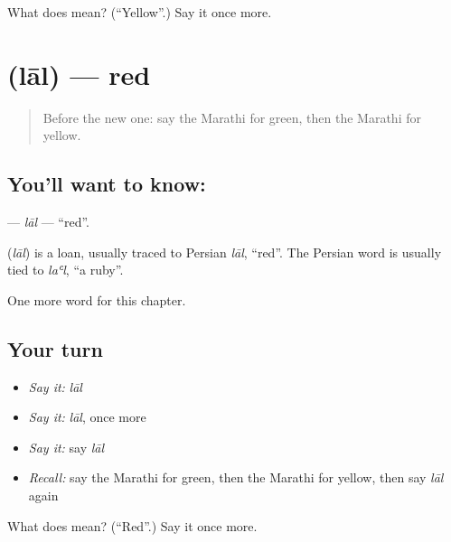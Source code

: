 \begin{tcolorbox}[breakable,colback=teal!4,colframe=teal!35!black,title={Before you move on}]
What does  mean? (\textquotedblleft{}Yellow\textquotedblright{}.) Say it once more.
\end{tcolorbox}
\section[\texorpdfstring{\mr{लाल} (lāl)}{लाल (lāl)}]{ (lāl) — red}

\label{lesson:MR-C107-lal}



\begin{quote}
Before the new one: say the Marathi for green, then the Marathi for yellow.
\end{quote}

\subsection*{You'll want to know: }
\textbf{} — \emph{lāl} — \textquotedblleft{}red\textquotedblright{}.

\begin{cousinweb}
\textbf{} (\emph{lāl}) is a loan, usually traced to Persian \emph{lāl}, \textquotedblleft{}red\textquotedblright{}. The Persian word is usually tied to \emph{laʿl}, \textquotedblleft{}a ruby\textquotedblright{}.
\end{cousinweb}

\begin{grammarlens}[title={What you've built}]
One more word for this chapter.
\end{grammarlens}

\subsection*{Your turn}
\begin{itemize}
\raggedright
  \item \emph{Say it:} \emph{lāl}
  \item \emph{Say it:} \emph{lāl}, once more
  \item \emph{Say it:} say \emph{lāl}
  \item \emph{Recall:} say the Marathi for green, then the Marathi for yellow, then say \emph{lāl} again
\end{itemize}

\begin{tcolorbox}[breakable,colback=teal!4,colframe=teal!35!black,title={Before you move on}]
What does  mean? (\textquotedblleft{}Red\textquotedblright{}.) Say it once more.
\end{tcolorbox}

